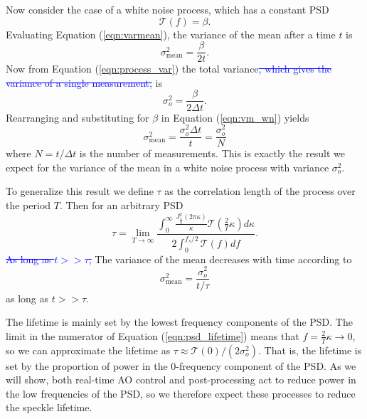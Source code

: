 \documentclass[10pt,preprint]{aastex631}
\newcommand{\jrmrmv}[1]{\textcolor{blue}{\sout{#1}}}
\begin{document}
Now consider the case of a white noise process, which has a constant PSD
\begin{equation}
\mathcal{T}(f) = \beta.
\end{equation}
Evaluating Equation (\ref{eqn:varmean}), the variance of the mean after a time $t$ is 
\begin{equation}
\sigma_\mathrm{mean}^2 = \frac{\beta}{2t}.
\label{eqn:vm_wn}
\end{equation}
Now from Equation (\ref{eqn:process_var}) the total variance\jrmrmv{, which gives the variance of a single measurement,} is
\begin{equation}
\sigma_o^2  = \frac{\beta}{2\Delta t}.
\end{equation}
Rearranging and substituting for $\beta$ in Equation (\ref{eqn:vm_wn}) yields
\begin{equation}
\sigma_\mathrm{mean}^2 =  \frac{\sigma_o^2 \Delta t}{t} = \frac{\sigma_o^2}{N}
\end{equation}
where $N = t/\Delta t$ is the number of measurements.  This is exactly the result we expect for the variance of the mean in a white noise process with variance $\sigma^2_o$. 

To generalize this result we define $\tau$ as the correlation length of the process over the period $T$.  Then for an arbitrary PSD
\begin{equation}
\tau = \lim_{T\to\infty}\frac{ \displaystyle\int_0^{\infty} \frac{ J_{\frac{1}{2}}^2(2\pi \kappa)}{\kappa} \mathcal{T}\left( \frac{2}{T} \kappa \right) d\kappa}{ 2 \displaystyle\int_{0}^{f_s/2} \mathcal{T}(f) df}.
\label{eqn:psd_lifetime}
\end{equation}
\jrmrmv{As long as $t >> \tau$, }The variance of the mean decreases with time according to
\begin{equation}
\sigma_\mathrm{mean}^2 =  \frac{\sigma_o^2}{t/\tau}
\end{equation}
as long as $t >> \tau$.

The lifetime is mainly set by the lowest frequency components of the PSD.  The limit in the numerator of Equation (\ref{eqn:psd_lifetime}) means that $f = \frac{2}{T}\kappa \rightarrow 0$, so we can approximate the lifetime as $\tau \approx \mathcal{T}(0)/(2\sigma_o^2)$.  That is, the lifetime is set by the proportion of power in the 0-frequency component of the PSD.  As we will show, both real-time AO control and post-processing act to reduce power in the low frequencies of the PSD, so we therefore expect these processes to reduce the speckle lifetime.
\end{document}
